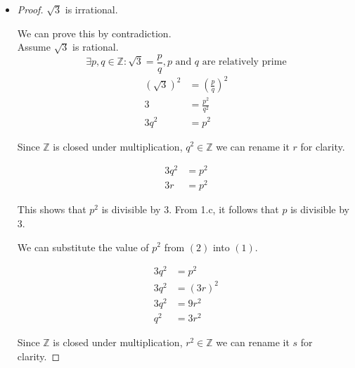 \documentclass[12pt]{article}
\begin{document}
\begin{enumerate}
\begin{enumerate}
\begin{itemize}
                \item
                    \begin{proof}
                        $\sqrt{3}$ is irrational.

                        We can prove this by contradiction. \\

                        Assume $\sqrt{3}$ is rational.
                        \[
                            \exists p, q \in \mathbb{Z} :
                            \sqrt{3} = \frac{p}{q},
                            p \text{ and } q \text{ are relatively prime}
                        \]
                        \begin{align*}
                            \left(\sqrt{3}\right)^2 &=
                                \left(\frac{p}{q}\right)^2 \\
                            3 &= \frac{p^2}{q^2} \\
                            3q^2 &= p^2 \tag{1}
                        \end{align*}

                        Since $\mathbb{Z}$ is closed under multiplication,
                        $q^2 \in \mathbb{Z}$ we can rename it $r$ for clarity.

                        \begin{align*}
                            3q^2 &= p^2 \\
                            3r &= p^2 \tag{2}
                        \end{align*}

                        This shows that $p^2$ is divisible by $3$.
                        From 1.c, it follows that $p$ is divisible by $3$.

                        We can substitute the value of $p^2$
                        from $(2)$ into $(1)$.

                        \begin{align*}
                            3q^2 &= p^2 \\
                            3q^2 &= \left(3r\right)^2 \\
                            3q^2 &= 9r^2 \\
                            q^2 &= 3r^2
                        \end{align*}

                        Since $\mathbb{Z}$ is closed under multiplication,
                        $r^2 \in \mathbb{Z}$ we can rename it $s$ for clarity.


\end{proof}
\end{itemize}
\end{enumerate}
\end{enumerate}
\end{document}
